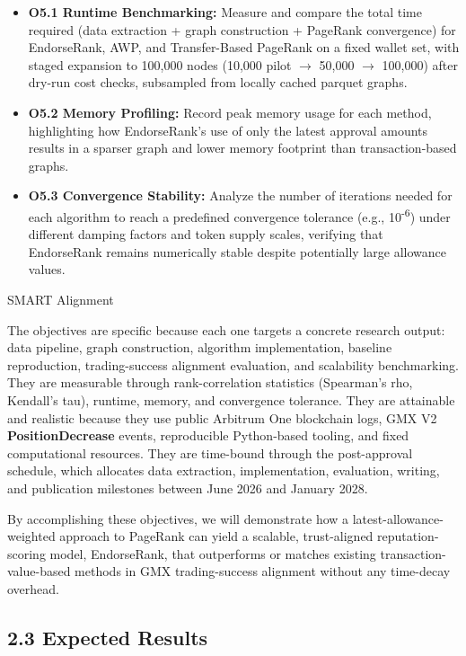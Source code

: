 \begin{itemize}
\item[\textbullet] \textbf{O5.1 Runtime Benchmarking: }Measure and compare the total time required (data extraction + graph construction + PageRank convergence) for EndorseRank, AWP, and Transfer-Based PageRank on a fixed wallet set, with staged expansion to 100,000 nodes (10,000 pilot $\to$ 50,000 $\to$ 100,000) after dry-run cost checks, subsampled from locally cached parquet graphs.
\item[\textbullet] \textbf{O5.2 Memory Profiling: }Record peak memory usage for each method, highlighting how EndorseRank's use of only the latest approval amounts results in a sparser graph and lower memory footprint than transaction-based graphs.
\item[\textbullet] \textbf{O5.3 Convergence Stability}\textbf{: }Analyze the number of iterations needed for each algorithm to reach a predefined convergence tolerance (e.g., 10\textsuperscript{-}\textsuperscript{6}) under different damping factors and token supply scales, verifying that EndorseRank remains numerically stable despite potentially large allowance values.
\end{itemize}
SMART Alignment


The objectives are specific because each one targets a concrete research output: data pipeline, graph construction, algorithm implementation, baseline reproduction, trading-success alignment evaluation, and scalability benchmarking. They are measurable through rank-correlation statistics (Spearman's rho, Kendall's tau), runtime, memory, and convergence tolerance. They are attainable and realistic because they use public Arbitrum One blockchain logs, GMX V2 \textbf{PositionDecrease} events, reproducible Python-based tooling, and fixed computational resources. They are time-bound through the post-approval schedule, which allocates data extraction, implementation, evaluation, writing, and publication milestones between June 2026 and January 2028.


By accomplishing these objectives, we will demonstrate how a latest-allowance-weighted approach to PageRank can yield a scalable, trust-aligned reputation-scoring model, EndorseRank, that outperforms or matches existing transaction-value-based methods in GMX trading-success alignment without any time-decay overhead.


\subsection*{2.3 Expected Results}
\label{sec:expected-results}

